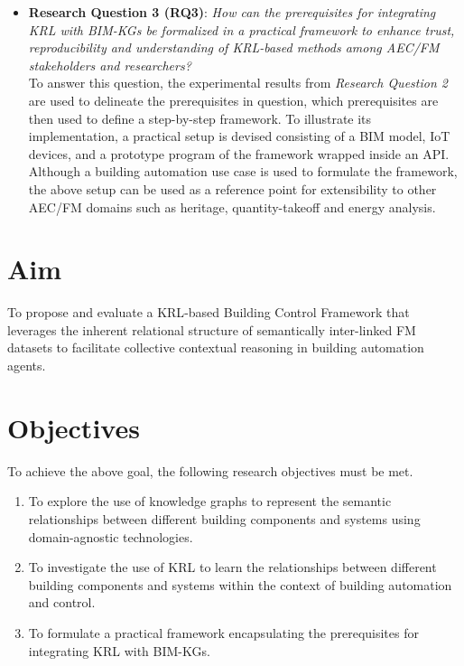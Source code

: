 \begin{itemize}
    \item
    \textbf{Research Question 3 (RQ3)}: \emph{How can the prerequisites for integrating \ac{KRL} with \acp{BIM-KG} be formalized in a practical framework to enhance trust, reproducibility and understanding of KRL-based methods among AEC/FM stakeholders and researchers?} \\

    To answer this question, the experimental results from \textit{Research Question 2} are used to delineate the prerequisites in question, which prerequisites are then used to define a step-by-step framework. To illustrate its implementation, a practical setup is devised consisting of a \ac{BIM} model, \ac{IoT} devices, and a prototype program of the framework wrapped inside an \ac{API}. Although a building automation use case is used to formulate the framework, the above setup can be used as a reference point for extensibility to other \ac{AEC/FM} domains such as heritage, quantity-takeoff and energy analysis.   
\end{itemize}

\section{Aim}
To propose and evaluate a \ac{KRL}-based Building Control Framework that leverages the inherent relational structure of semantically inter-linked \ac{FM} datasets to facilitate collective contextual reasoning in building automation agents.

\section{Objectives}
To achieve the above goal, the following research objectives must be met.

\begin{enumerate}

	\item
	To explore the use of knowledge graphs to represent the semantic relationships between different building components and systems using domain-agnostic technologies.
 
	\item 
	To investigate the use of \ac{KRL} to learn the relationships between different building components and systems within the context of building automation and control.
 
        \item
    To formulate a practical framework encapsulating the prerequisites for integrating \ac{KRL} with \acp{BIM-KG}.
\end{enumerate}

